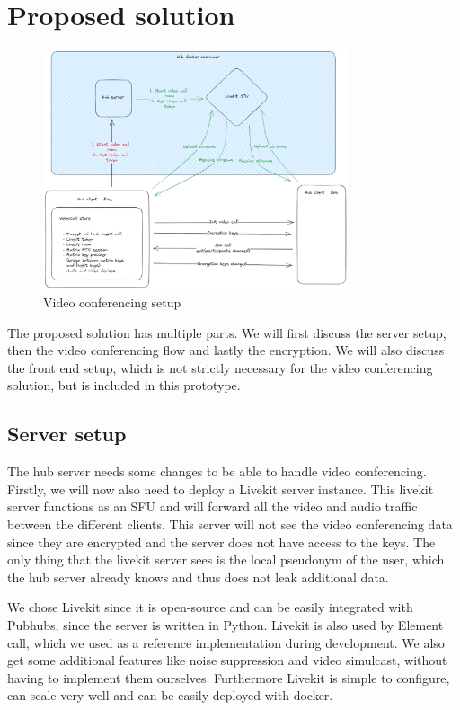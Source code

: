 \documentclass{report}
\begin{document}
\chapter{Proposed solution}
\begin{figure}[!hbt]
\centering
\includegraphics[width=0.8\textwidth]{img/PH_videocall.excalidraw.png}
\caption{Video conferencing setup}
\label{fig:video-conference-setup}
\end{figure}

The proposed solution has multiple parts. We will first discuss the server setup, then the video conferencing flow
and lastly the encryption. We will also discuss the front end setup, which is not strictly necessary for the video
conferencing solution, but is included in this prototype.

\section{Server setup}
The hub server needs some changes to be able to handle video conferencing. Firstly, we will now also need to deploy a
Livekit server instance. This livekit server functions as an SFU and will forward all the video and audio traffic
between the different clients. This server will not see the video conferencing data since they are
encrypted and the server does not have access to the keys. The only thing that the livekit server sees is the local
pseudonym of the user, which the hub server already knows and thus does not leak additional data.

We chose Livekit since it is open-source and can be easily integrated with Pubhubs, since the server is written in
Python. Livekit is also used by Element call, which we used as a reference implementation during development. We
also get some additional features like noise suppression and video simulcast, without having to implement them
ourselves. Furthermore Livekit is simple to configure, can scale very well and can be easily deployed with docker.
\end{document}
